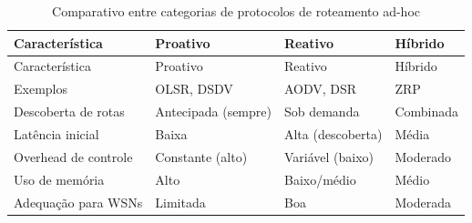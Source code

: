{\def\LTcaptype{quadro}
\begin{longtable}[]{@{}
  >{\raggedright\arraybackslash}p{}
  >{\raggedright\arraybackslash}p{}
  >{\raggedright\arraybackslash}p{}
  >{\raggedright\arraybackslash}p{}@{}}
\caption{Comparativo entre categorias de protocolos de roteamento ad-hoc}\label{quadro:comp-protocolos}\\
\toprule\noalign{}
\begin{minipage}[b]{\linewidth}\raggedright
Característica
\end{minipage} & \begin{minipage}[b]{\linewidth}\raggedright
Proativo
\end{minipage} & \begin{minipage}[b]{\linewidth}\raggedright
Reativo
\end{minipage} & \begin{minipage}[b]{\linewidth}\raggedright
Híbrido
\end{minipage} \\
\midrule\noalign{}
\endfirsthead
\toprule\noalign{}
\begin{minipage}[b]{\linewidth}\raggedright
Característica
\end{minipage} & \begin{minipage}[b]{\linewidth}\raggedright
Proativo
\end{minipage} & \begin{minipage}[b]{\linewidth}\raggedright
Reativo
\end{minipage} & \begin{minipage}[b]{\linewidth}\raggedright
Híbrido
\end{minipage} \\
\midrule\noalign{}
\endhead
\bottomrule\noalign{}
\endlastfoot
Exemplos & OLSR, DSDV & AODV, DSR & ZRP \\
Descoberta de rotas & Antecipada (sempre) & Sob demanda & Combinada \\
Latência inicial & Baixa & Alta (descoberta) & Média \\
Overhead de controle & Constante (alto) & Variável (baixo) & Moderado \\
Uso de memória & Alto & Baixo/médio & Médio \\
Adequação para WSNs & Limitada & Boa & Moderada \\
\end{longtable}
}

